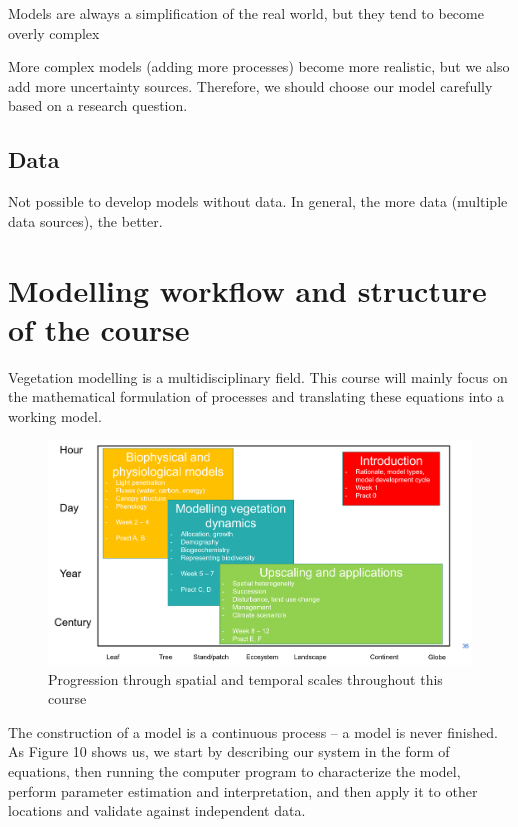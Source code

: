 \documentclass[12pt,oneside]{book}
\begin{document}
Models are always a simplification of the real world, but they tend to
become overly complex

More complex models (adding more processes) become more realistic, but
we also add more uncertainty sources. Therefore, we should choose our
model carefully based on a research question.

\subsection{Data}\label{data}

Not possible to develop models without data. In general, the more data
(multiple data sources), the better.

\section{Modelling workflow and structure of the
course}\label{modelling-workflow-and-structure-of-the-course}

Vegetation modelling is a multidisciplinary field. This course will
mainly focus on the mathematical formulation of processes and
translating these equations into a working model.

\begin{figure}

{\centering \includegraphics[width=0.8\linewidth]{figures/chap1/course_overview} 

}

\caption{Progression through spatial and temporal scales throughout this course}\label{fig:f12}
\end{figure}

The construction of a model is a continuous process -- a model is never
finished. As Figure 10 shows us, we start by describing our system in
the form of equations, then running the computer program to characterize
the model, perform parameter estimation and interpretation, and then
apply it to other locations and validate against independent data.
\end{document}
